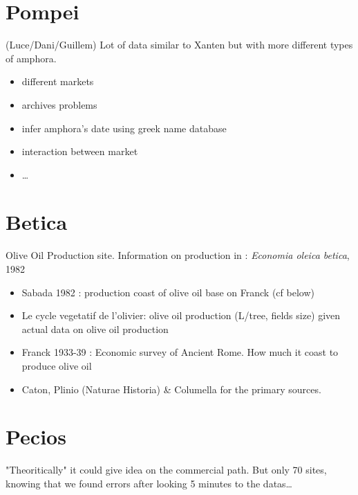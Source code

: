 \section*{Pompei}
(Luce/Dani/Guillem)
Lot of data similar to Xanten but with more different types of amphora.
\begin{itemize}
        \item different markets
        \item archives problems
        \item infer amphora's date using greek name database
        \item interaction between market
        \item \ldots
\end{itemize}
\section*{Betica}
Olive Oil Production site. Information on production in : \emph{Economia oleica betica}, 1982
\begin{itemize}
        \item Sabada 1982 : production coast of olive oil base on Franck (cf below)
        \item Le cycle vegetatif de l'olivier: olive oil production (L/tree, fields size) given actual data on olive oil production
        \item Franck 1933-39 : Economic survey of Ancient Rome. How much it coast to produce olive oil
        \item Caton, Plinio (Naturae Historia) \& Columella for the primary sources.
\end{itemize}

\section*{Pecios}
"Theoritically" it could give idea on the commercial path. But only 70 sites, knowing that we found errors after looking 5 minutes to the datas\ldots


